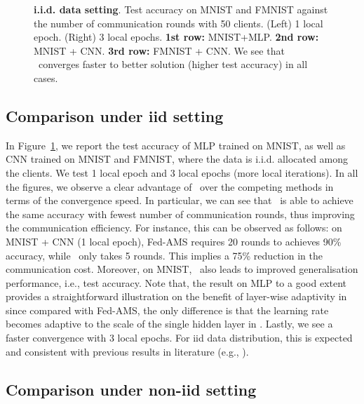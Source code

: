 \documentclass[nohyperref]{article}
\begin{document}
\begin{figure}[t]
\begin{center}
{        }
    \end{center}
	\caption{\textbf{i.i.d. data setting}. Test accuracy on MNIST and FMNIST against the number of communication rounds with 50 clients. (Left) 1 local epoch. (Right) 3 local epochs. \textbf{1st row:} MNIST+MLP. \textbf{2nd row:} MNIST + CNN. \textbf{3rd row:} FMNIST + CNN. We see that \algo\ converges faster to better solution (higher test accuracy) in all cases.
	}
	\label{fig:iid}\vspace{-0.1in}
\end{figure}

\subsection{Comparison under iid setting}

In Figure~\ref{fig:iid}, we report the test accuracy of MLP trained on MNIST, as well as CNN trained on MNIST and FMNIST, where the data is i.i.d. allocated among the clients. We test 1 local epoch and 3 local epochs (more local iterations). In all the figures, we observe a clear advantage of \algo\ over the competing methods in terms of the convergence speed. In particular, we can see that \algo\ is able to achieve the same accuracy with fewest number of communication rounds, thus improving the communication efficiency. For instance, this can be observed as follows: on MNIST + CNN (1 local epoch), Fed-AMS requires 20 rounds to achieves 90\% accuracy, while \algo\ only takes 5 rounds. This implies a 75\% reduction in the communication cost. Moreover, on MNIST, \algo\ also leads to improved generalisation performance, i.e., test accuracy. Note that, the result on MLP to a good extent provides a straightforward illustration on the benefit of layer-wise adaptivity in \algo\, since compared with Fed-AMS, the only difference is that the learning rate becomes adaptive to the scale of the single hidden layer in \algo. Lastly, we see a faster convergence with 3 local epochs. For iid data distribution, this is expected and consistent with previous results in literature (e.g., \cite{reddi2020adaptive}).





\subsection{Comparison under non-iid setting}
\end{document}
